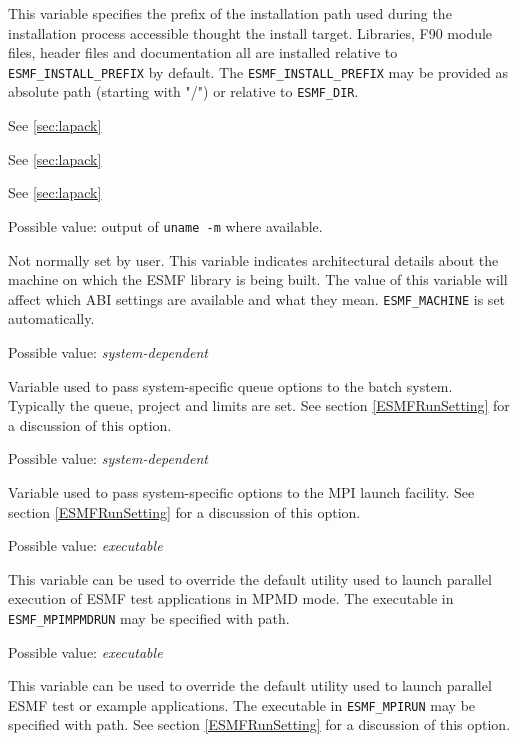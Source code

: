 \begin{description}
This variable specifies the prefix of the installation path used during the
installation process accessible thought the install target. Libraries, F90
module files, header files and documentation all are installed relative to
{\tt ESMF\_INSTALL\_PREFIX} by default. The {\tt ESMF\_INSTALL\_PREFIX} may be
provided as absolute path (starting with "/") or relative to {\tt ESMF\_DIR}.

\item[ESMF\_LAPACK]
See \ref{sec:lapack}

\item[ESMF\_LAPACK\_LIBPATH]
See \ref{sec:lapack}

\item[ESMF\_LAPACK\_LIBS]
See \ref{sec:lapack}

\item[ESMF\_MACHINE]
Possible value: output of {\tt uname -m} where available.

Not normally set by user. This variable indicates architectural details about
the machine on which the ESMF library is being built. The value of this
variable will affect which ABI settings are available and what they mean.
{\tt ESMF\_MACHINE} is set automatically.

\item[ESMF\_MPIBATCHOPTIONS]
Possible value: {\em system-dependent}

Variable used to pass system-specific queue options to the batch system.
Typically the queue, project and limits are set.
See section \ref{ESMFRunSetting} for a discussion of this option.

\item[ESMF\_MPILAUNCHOPTIONS]
Possible value: {\em system-dependent}

Variable used to pass system-specific options to the MPI launch facility.
See section \ref{ESMFRunSetting} for a discussion of this option.

\item[ESMF\_MPIMPMDRUN]
Possible value: {\em executable}

This variable can be used to override the default utility used to launch
parallel execution of ESMF test applications in MPMD mode. The executable in
{\tt ESMF\_MPIMPMDRUN} may be specified with path.

\item[ESMF\_MPIRUN]
Possible value: {\em executable}

This variable can be used to override the default utility used to launch
parallel ESMF test or example applications. The executable in {\tt ESMF\_MPIRUN}
may be specified with path.
See section \ref{ESMFRunSetting} for a discussion of this option.


\end{description}
